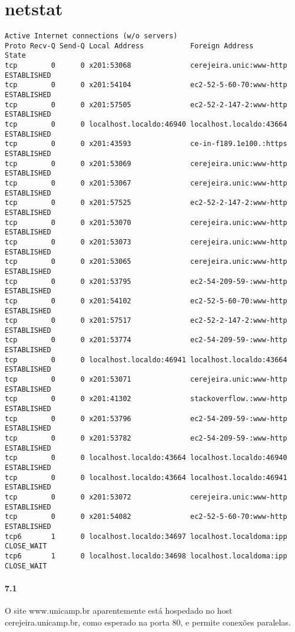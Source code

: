 \documentclass{article}
\begin{document}
\section*{netstat}
\begin{verbatim}
Active Internet connections (w/o servers)
Proto Recv-Q Send-Q Local Address           Foreign Address         State      
tcp        0      0 x201:53068              cerejeira.unic:www-http ESTABLISHED
tcp        0      0 x201:54104              ec2-52-5-60-70:www-http ESTABLISHED
tcp        0      0 x201:57505              ec2-52-2-147-2:www-http ESTABLISHED
tcp        0      0 localhost.localdo:46940 localhost.localdo:43664 ESTABLISHED
tcp        0      0 x201:43593              ce-in-f189.1e100.:https ESTABLISHED
tcp        0      0 x201:53069              cerejeira.unic:www-http ESTABLISHED
tcp        0      0 x201:53067              cerejeira.unic:www-http ESTABLISHED
tcp        0      0 x201:57525              ec2-52-2-147-2:www-http ESTABLISHED
tcp        0      0 x201:53070              cerejeira.unic:www-http ESTABLISHED
tcp        0      0 x201:53073              cerejeira.unic:www-http ESTABLISHED
tcp        0      0 x201:53065              cerejeira.unic:www-http ESTABLISHED
tcp        0      0 x201:53795              ec2-54-209-59-:www-http ESTABLISHED
tcp        0      0 x201:54102              ec2-52-5-60-70:www-http ESTABLISHED
tcp        0      0 x201:57517              ec2-52-2-147-2:www-http ESTABLISHED
tcp        0      0 x201:53774              ec2-54-209-59-:www-http ESTABLISHED
tcp        0      0 localhost.localdo:46941 localhost.localdo:43664 ESTABLISHED
tcp        0      0 x201:53071              cerejeira.unic:www-http ESTABLISHED
tcp        0      0 x201:41302              stackoverflow.:www-http ESTABLISHED
tcp        0      0 x201:53796              ec2-54-209-59-:www-http ESTABLISHED
tcp        0      0 x201:53782              ec2-54-209-59-:www-http ESTABLISHED
tcp        0      0 localhost.localdo:43664 localhost.localdo:46940 ESTABLISHED
tcp        0      0 localhost.localdo:43664 localhost.localdo:46941 ESTABLISHED
tcp        0      0 x201:53072              cerejeira.unic:www-http ESTABLISHED
tcp        0      0 x201:54082              ec2-52-5-60-70:www-http ESTABLISHED
tcp6       1      0 localhost.localdo:34697 localhost.localdoma:ipp CLOSE_WAIT 
tcp6       1      0 localhost.localdo:34698 localhost.localdoma:ipp CLOSE_WAIT 

\end{verbatim}
\paragraph{7.1} O site www.unicamp.br aparentemente está hospedado no host cerejeira.unicamp.br, como
esperado na porta 80, e permite conexões paralelas.
\end{document}
